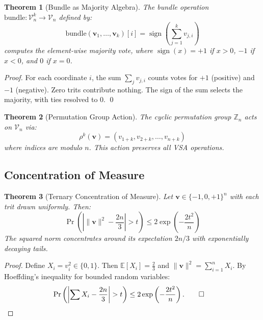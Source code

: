 \documentclass[aps,prd,preprint,superscriptaddress,showpacs,nofootinbib,longbibliography]{revtex4-2}
\newtheorem{theorem}{Theorem}
\begin{document}
\begin{theorem}[Bundle as Majority Algebra]
\label{thm:bundle_majority}
The bundle operation $\text{bundle}: \mathcal{V}_n^k \to \mathcal{V}_n$ defined by:
\begin{equation}
\text{bundle}(\mathbf{v}_1, \ldots, \mathbf{v}_k)[i] = \operatorname{sign}\left(\sum_{j=1}^k v_{j,i}\right)
\end{equation}
computes the element-wise majority vote, where $\operatorname{sign}(x) = +1$ if $x > 0$, $-1$ if $x < 0$, and $0$ if $x = 0$.
\end{theorem}

\begin{proof}
For each coordinate $i$, the sum $\sum_j v_{j,i}$ counts votes for $+1$ (positive) and $-1$ (negative). Zero trits contribute nothing. The sign of the sum selects the majority, with ties resolved to $0$. \qed
\end{proof}

\begin{theorem}[Permutation Group Action]
\label{thm:permutation}
The cyclic permutation group $\mathbb{Z}_n$ acts on $\mathcal{V}_n$ via:
\begin{equation}
\rho^k(\mathbf{v}) = (v_{1+k}, v_{2+k}, \ldots, v_{n+k})
\end{equation}
where indices are modulo $n$. This action preserves all VSA operations.
\end{theorem}

\subsection{Concentration of Measure}
\label{sec:concentration}

\begin{theorem}[Ternary Concentration of Measure]
\label{thm:concentration}
Let $\mathbf{v} \in \{-1, 0, +1\}^n$ with each trit drawn uniformly. Then:
\begin{equation}
\Pr\left(\left| \|\mathbf{v}\|^2 - \frac{2n}{3} \right| > t\right) \leq 2 \exp\left(-\frac{2t^2}{n}\right)
\end{equation}
The squared norm concentrates around its expectation $2n/3$ with exponentially decaying tails.
\end{theorem}

\begin{proof}
Define $X_i = v_i^2 \in \{0, 1\}$. Then $\mathbb{E}[X_i] = \frac{2}{3}$ and $\|\mathbf{v}\|^2 = \sum_{i=1}^n X_i$. By Hoeffding's inequality for bounded random variables:
\begin{align}
\Pr\left(\left|\sum X_i - \frac{2n}{3}\right| > t\right) &\leq 2 \exp\left(-\frac{2t^2}{n}\right). \qed
\end{align}
\end{proof}
\end{document}
